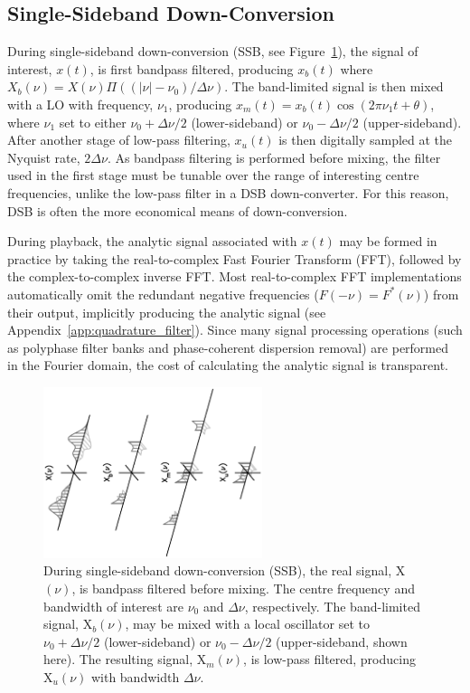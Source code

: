 \documentclass[twocolumn]{aastex6}
\newcommand{\Fig}[1]{Figure~\ref{fig:#1}}
\newcommand{\App}[1]{Appendix~\ref{app:#1}}
\newcommand{\bw}{\ensuremath{ \Delta\nu }}
\begin{document}
\begin{appendix}
\subsection{Single-Sideband Down-Conversion}
\label{app:ssb}

During single-sideband down-conversion (SSB, see \Fig{ssb}), the
signal of interest, $x(t)$, is first bandpass filtered, producing
$x_b(t)$ where \mbox{$X_b(\nu)=X(\nu)\Pi((|\nu|-\nu_0)/\Delta\nu)$}.  The
band-limited signal is then mixed with a LO with frequency, $\nu_1$,
producing \mbox{$x_m(t)=x_b(t)\cos(2\pi\nu_1t+\theta)$}, where $\nu_1$
set to either $\nu_0+\Delta\nu/2$ (lower-sideband) or $\nu_0-\Delta\nu/2$
(upper-sideband).
After another stage of low-pass filtering, $x_u(t)$
is then digitally sampled at the Nyquist rate, $2\Delta\nu$.  As
bandpass filtering is performed before mixing, the filter used in the
first stage must be tunable over the range of interesting centre
frequencies, unlike the low-pass filter in a DSB down-converter.  For
this reason, DSB is often the more economical means of
down-conversion.

During playback, the analytic signal associated with $x(t)$ may be
formed in practice by taking the real-to-complex Fast Fourier
Transform (FFT), followed by the complex-to-complex inverse
FFT.  Most real-to-complex FFT implementations automatically omit the
redundant negative frequencies ($F(-\nu)=F^*(\nu)$) from their output,
implicitly producing the analytic signal (see
\App{quadrature_filter}).  Since many signal processing operations
(such as polyphase filter banks and phase-coherent dispersion removal)
are performed in the Fourier domain, the cost of calculating the
analytic signal is transparent.

\begin{figure}
\centerline{\includegraphics[height=5cm,angle=-90]{usb.eps}}
\caption{During single-sideband down-conversion (SSB), the real signal,
X$(\nu)$, is bandpass filtered before mixing.  The centre frequency
and bandwidth of interest are $\nu_0$ and \bw, respectively.
The band-limited signal, X$_b(\nu)$, may be mixed with a local
oscillator set to $\nu_0+\Delta\nu/2$ (lower-sideband) or
$\nu_0-\Delta\nu/2$ (upper-sideband, shown here). The resulting
signal, X$_m(\nu)$, is low-pass filtered, producing X$_u(\nu)$ with
bandwidth \bw.}
\label{fig:ssb}
\end{figure}


\end{appendix}



\end{document}
